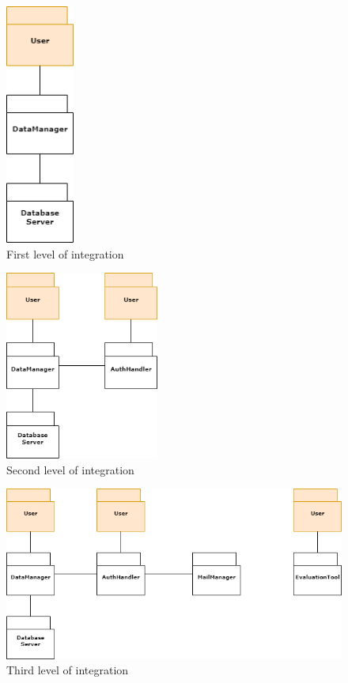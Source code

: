 \begin{figure}[H]
    \centering
    \includegraphics[width=0.2\textwidth]{images/integration_plan/first_level_integration.png}
    \caption{First level of integration}
\end{figure}

\begin{figure}[H]
    \centering
    \includegraphics[width=0.45\textwidth]{images/integration_plan/second_level_integration.png}
    \caption{Second level of integration}
\end{figure}

\begin{figure}[H]
    \centering
    \includegraphics[width=1\textwidth]{images/integration_plan/third_level_integration.png}
    \caption{Third level of integration}
\end{figure}

